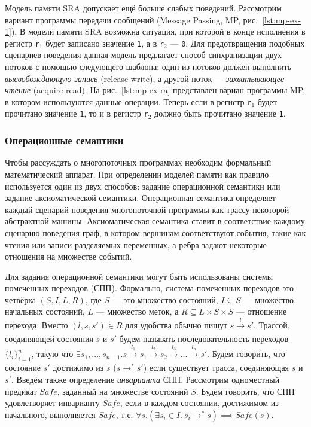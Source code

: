 Модель памяти SRA допускает ещё больше слабых поведений.
Рассмотрим вариант программы передачи сообщений (Message Passing, MP, рис.~\ref{lst:mp-ex-1}).
В модели памяти SRA возможна ситуация, при которой в конце исполнения 
в регистр \texttt{r$_1$} будет записано значение \texttt{1}, 
а в \texttt{r$_2$} --- \texttt{0}. 
Для предотвращения подобных сценариев поведения
данная модель предлагает способ синхранизации двух потоков 
с помощью следующего шаблона:
один из потоков должен выполнить \emph{высвобождающую запись} (release-write),
а другой поток --- \emph{захватывающее чтение} (acquire-read).
На рис.~\ref{lst:mp-ex-ra} представлен вариан программы MP, 
в котором используются данные операции.
Теперь если в регистр \texttt{r$_1$} будет прочитано значение \texttt{1},
то и в регистр \texttt{r$_2$} должно быть прочитано значение \texttt{1}.

\subsubsection{Операционные семантики}

\label{sec:tls}

Чтобы рассуждать о многопоточных программах
необходим формальный математический аппарат. 
При определении моделей памяти как правило используется один из двух способов:
задание операционной семантики или задание аксиоматической семантики.
Операционная семантика определяет каждый сценарий поведения многопоточной программы 
как трассу некоторой абстрактной машины.
Аксиоматическая семантика ставит в соответствие каждому сценарию поведения граф,
в котором вершинам соответствуют события, такие как чтения 
или записи разделяемых переменных,
а ребра задают некоторые отношения на множестве событий.

Для задания операционной семантики могут быть использованы системы помеченных переходов (СПП).
Формально, система помеченных переходов это четвёрка $(S, I, L, R)$,
где $S$ --- это множество состояний, 
$I \subseteq S$ --- множество начальных состояний,
$L$ --- множество меток, а $R \subseteq L \times S \times S$ --- отношение перехода.
Вместо $(l, s, s') \in R$ для удобства обычно пишут $s \xrightarrow[]{l} s'$.
Трассой, соединяющей состояния $s$ и $s'$ будем называть последовательность 
переходов $\{l_i\}_{i=1}^{n}$, такую что 
$\exists s_1, ..., s_{n-1}. s \xrightarrow[]{l_1} s_1 \xrightarrow[]{l_2} s_2 \xrightarrow[]{l_3} ... \xrightarrow[]{l_n} s' $.
Будем говорить, что состояние $s'$ достижимо из $s$ ($s \rightarrow^* s'$) если существует трасса, 
соединяющая $s$ и $s'$. 
Введём также определение \emph{инварианта} СПП.
Рассмотрим одноместный предикат $Safe$, заданный на множестве состояний $S$.
Будем говорить, что СПП удовлетворяет инварианту $Safe$,
если в каждом состоянии, достижимом из начального, выполняется $Safe$,
т.е. $\forall{s}.(\exists{s_i} \in I.~ s_i \rightarrow^* s) \implies Safe(s)$.

